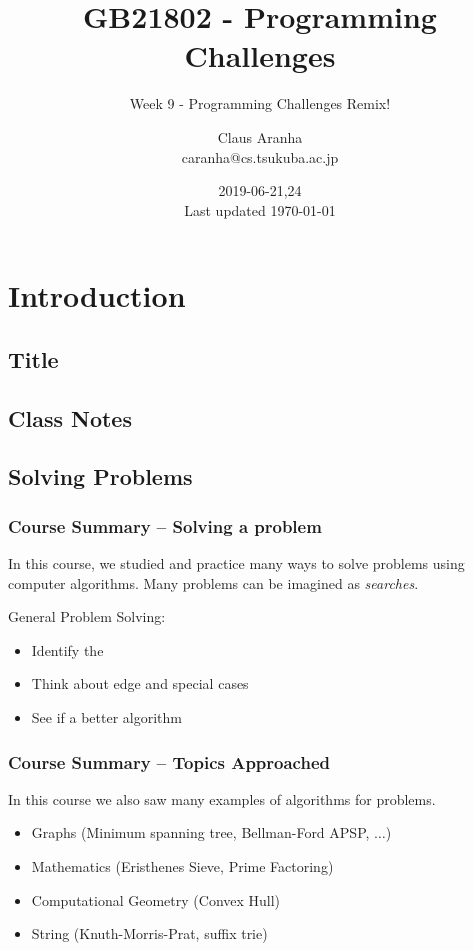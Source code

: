 \documentclass{beamer}
\title[GB21802]{GB21802 - Programming Challenges}
\subtitle[]{Week 9 - Programming Challenges Remix!}
\author[Claus Aranha]{Claus Aranha\\{\footnotesize caranha@cs.tsukuba.ac.jp}}
\institute{College of Information Science}
\date{2019-06-21,24\\{\tiny Last updated \today}}
\begin{document}
\section{Introduction}
\subsection{Title}
\begin{frame}
\maketitle
\end{frame}

\subsection{Class Notes}



\subsection{Solving Problems}
\begin{frame}
  \frametitle{Course Summary -- Solving a problem}

  \begin{block}{}
    In this course, we studied and practice many ways
    to solve problems using computer algorithms. Many
    problems can be imagined as \emph{searches}.
  \end{block}

  \vfill

  General Problem Solving:
  \begin{itemize}
  \item Identify the 
  \item Think about edge and special cases
  \item See if a better algorithm 
  \end{itemize}

\end{frame}

\begin{frame}
  \frametitle{Course Summary -- Topics Approached}

  \begin{exampleblock}{}
    In this course we also saw many examples of 
    algorithms for problems.
  \end{exampleblock}

  \vfill

  \begin{itemize}
  \item Graphs (Minimum spanning tree, Bellman-Ford APSP, $\ldots$)
  \item Mathematics (Eristhenes Sieve, Prime Factoring)
  \item Computational Geometry (Convex Hull)
  \item String (Knuth-Morris-Prat, suffix trie)
  \end{itemize}

\end{frame}
\end{document}
